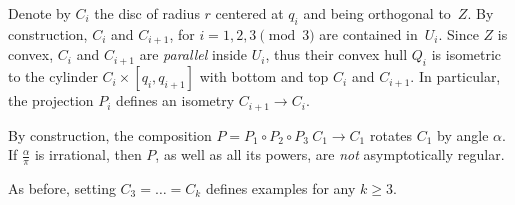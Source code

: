\documentclass[a4paper,10pt]{article}
\begin{document}
Denote by $C_i$ the disc of radius $r$ centered at $q_i$ and being orthogonal to~$Z$.
By construction, $C_i$ and $C_{i+1}$, for $i=1,2,3\pmod 3$   are contained in~$U_i$.
Since $Z$ is convex, $C_i$ and $C_{i+1}$ are \emph{parallel} inside $U_i$, thus their convex hull  $Q_i$ is isometric to the  cylinder $C_i \times [q_i,q_{i+1}]$ with bottom and top $C_i$ and $C_{i+1}$.
In particular, the projection $P_i$ defines an isometry $C_{i+1}\to C_{i}$.

By construction, the composition $P=P_1\circ P_2\circ P_3\:C_1\to C_1$ rotates $C_1$ by angle $\alpha$.
If $\tfrac\alpha\pi$ is irrational, then $P$, as well as all its powers, are \emph{not} asymptotically regular.

As before, setting $C_3=\dots=C_k$ defines examples for any $k\geq 3$.
\qeds


{\sloppy
\printbibliography[heading=bibintoc]
\fussy
}
\end{document}
